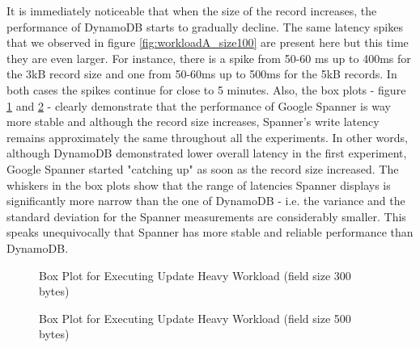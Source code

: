 \documentclass[letterpaper, 10 pt, conference]{ieeeconf}  %
\begin{document}
It is immediately noticeable that when the size of the record increases, the performance of DynamoDB starts to gradually decline. The same latency spikes that we observed in figure \ref{fig:workloadA_size100} are present here but this time they are even larger. For instance, there is a spike from 50-60 ms up to 400ms for the 3kB record size and one from 50-60ms up to 500ms for the 5kB records. In both cases the spikes continue for close to 5 minutes. Also, the box plots - figure \ref{fig:boxplot_size300} and \ref{fig:boxplot_size500} - clearly demonstrate that the performance of Google Spanner is way more stable and although the record size increases, Spanner's write latency remains approximately the same throughout all the experiments. In other words, although DynamoDB demonstrated lower overall latency in the first experiment, Google Spanner started "catching up" as soon as the record size increased. The whiskers in the box plots show that the range of latencies Spanner displays is significantly more narrow than the one of DynamoDB - i.e. the variance and the standard deviation for the Spanner measurements are considerably smaller. This speaks unequivocally that Spanner has more stable and reliable performance than DynamoDB. 

\begin{figure}[h]
\centering
{}
\caption{Box Plot for Executing Update Heavy Workload (field size 300 bytes)}
\label{fig:boxplot_size300}
\end{figure} 
 
\begin{figure}[h]
\centering
{}
\caption{Box Plot for Executing Update Heavy Workload (field size 500 bytes)}
\label{fig:boxplot_size500}
\end{figure} 
\end{document}
